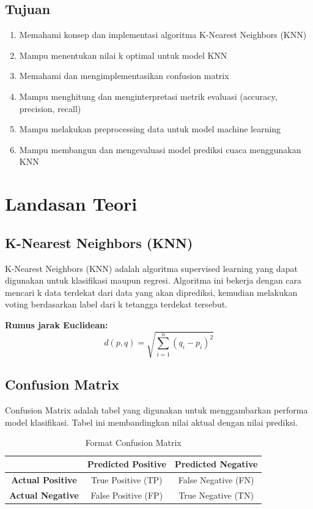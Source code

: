 \documentclass[12pt,a4paper]{article}
\begin{document}
\subsection{Tujuan}
\begin{enumerate}
    \item Memahami konsep dan implementasi algoritma K-Nearest Neighbors (KNN)
    \item Mampu menentukan nilai k optimal untuk model KNN
    \item Memahami dan mengimplementasikan confusion matrix
    \item Mampu menghitung dan menginterpretasi metrik evaluasi (accuracy, precision, recall)
    \item Mampu melakukan preprocessing data untuk model machine learning
    \item Mampu membangun dan mengevaluasi model prediksi cuaca menggunakan KNN
\end{enumerate}

\section{Landasan Teori}

\subsection{K-Nearest Neighbors (KNN)}
K-Nearest Neighbors (KNN) adalah algoritma supervised learning yang dapat digunakan untuk klasifikasi maupun regresi. Algoritma ini bekerja dengan cara mencari k data terdekat dari data yang akan diprediksi, kemudian melakukan voting berdasarkan label dari k tetangga terdekat tersebut.

\textbf{Rumus jarak Euclidean:}
\begin{equation}
d(p,q) = \sqrt{\sum_{i=1}^{n}(q_i - p_i)^2}
\end{equation}

\subsection{Confusion Matrix}
Confusion Matrix adalah tabel yang digunakan untuk menggambarkan performa model klasifikasi. Tabel ini membandingkan nilai aktual dengan nilai prediksi.

\begin{table}[H]
\centering
\caption{Format Confusion Matrix}
\begin{tabular}{|c|c|c|}
\hline
 & \textbf{Predicted Positive} & \textbf{Predicted Negative} \\
\hline
\textbf{Actual Positive} & True Positive (TP) & False Negative (FN) \\
\hline
\textbf{Actual Negative} & False Positive (FP) & True Negative (TN) \\
\hline
\end{tabular}
\end{table}
\end{document}
